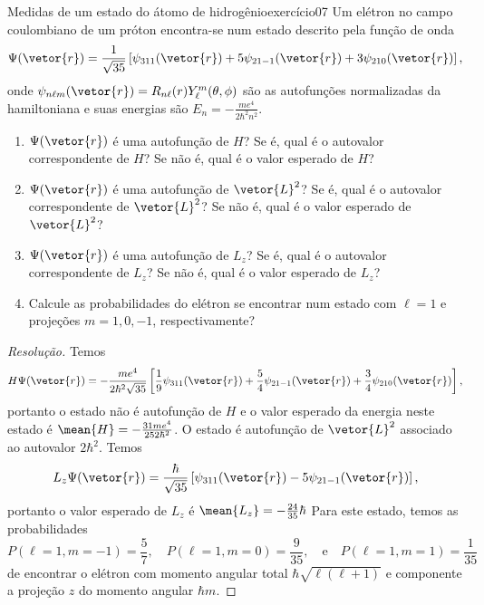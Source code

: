 \begin{exercício}{Medidas de um estado do átomo de hidrogênio}{exercício07}
    Um elétron no campo coulombiano de um próton encontra-se num estado descrito pela função de onda
    \begin{equation*}
        \Psi(\vetor{r}) = \frac1{\sqrt{35}}\left[\psi_{311}(\vetor{r}) + 5 \psi_{21-1}(\vetor{r}) + 3\psi_{210}(\vetor{r})\right],
    \end{equation*}
    onde \(\psi_{n\ell m}(\vetor{r}) = R_{n\ell}(r) Y_{\ell}^m(\theta, \phi)\) são as autofunções normalizadas da hamiltoniana e suas energias são \(E_n = - \frac{m e^4}{2\hbar^2 n^2}\).
    \begin{enumerate}[label=(\alph*)]
        \item \(\Psi(\vetor{r})\) é uma autofunção de \(H\)? Se é, qual é o autovalor correspondente de \(H\)? Se não é, qual é o valor esperado de \(H\)?
        \item \(\Psi(\vetor{r})\) é uma autofunção de \(\vetor{L}^2\)? Se é, qual é o autovalor correspondente de \(\vetor{L}^2\)? Se não é, qual é o valor esperado de \(\vetor{L}^2\)?
        \item \(\Psi(\vetor{r})\) é uma autofunção de \(L_z\)? Se é, qual é o autovalor correspondente de \(L_z\)? Se não é, qual é o valor esperado de \(L_z\)?
        \item Calcule as probabilidades do elétron se encontrar num estado com \(\ell = 1\) e projeções \(m = 1, 0, -1\), respectivamente?
    \end{enumerate}
\end{exercício}
\begin{proof}[Resolução]
    Temos
    \begin{equation*}
        H\Psi(\vetor{r}) = -\frac{me^4}{2\hbar^2\sqrt{35}}\left[\frac{1}{9}\psi_{311}(\vetor{r}) + \frac{5}{4}\psi_{21-1}(\vetor{r}) + \frac{3}{4} \psi_{210}(\vetor{r})\right],
    \end{equation*}
    portanto o estado não é autofunção de \(H\) e o valor esperado da energia neste estado é \(\mean{H} = -\frac{31m e^4}{252\hbar^2}\). O estado é autofunção de \(\vetor{L}^2\) associado ao autovalor \(2\hbar^2\). Temos
    \begin{equation*}
        L_z \Psi(\vetor{r}) = \frac{\hbar}{\sqrt{35}}\left[\psi_{311}(\vetor{r}) - 5\psi_{21-1}(\vetor{r})\right],
    \end{equation*}
    portanto o valor esperado de \(L_z\) é \(\mean{L_z} = -\frac{24}{35}\hbar \)
    Para este estado, temos as probabilidades
    \begin{equation*}
        P(\ell = 1, m = -1) = \frac{5}{7},\quad
        P(\ell = 1, m = 0) = \frac{9}{35},\quad\text{e}\quad
        P(\ell = 1, m = 1) = \frac{1}{35}
    \end{equation*}
    de encontrar o elétron com momento angular total \(\hbar \sqrt{\ell(\ell + 1)}\) e componente a projeção \(z\) do momento angular \(\hbar m\).
\end{proof}
